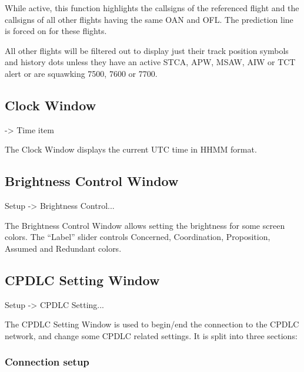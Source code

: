 \documentclass[a4paper,oneside,11pt]{memoir}
\begin{document}
\bigskip

While active, this function highlights the callsigns of the referenced flight and the callsigns of all other flights having the same OAN and OFL. The prediction line is forced on for these flights.

\bigskip

All other flights will be filtered out to display just their track position symbols and history dots unless they have an active STCA, APW, MSAW, AIW or TCT alert or are squawking 7500, 7600 or 7700.

\subsection{Clock Window}\label{win:clock}

 -> Time item


The Clock Window displays the current UTC time in HHMM format.

\subsection{Brightness Control Window}
\label{win:bcw}

 Setup -> Brightness Control...

\bigskip


The Brightness Control Window allows setting the brightness for some screen colors. The “Label” slider controls Concerned, Coordination, Proposition, Assumed and Redundant colors.

\subsection{CPDLC Setting Window}
\label{win:dls}

 Setup -> CPDLC Setting...


The CPDLC Setting Window is used to begin/end the connection to the CPDLC network, and change some CPDLC related settings. It is split into three sections:

\subsubsection*{Connection setup}
\end{document}
